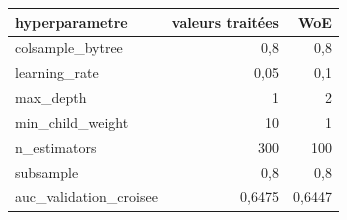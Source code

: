 \begin{tabular}{lrr}
\toprule
\textbf{hyperparametre} & \textbf{valeurs traitées} & \textbf{WoE} \\
\midrule
colsample\_bytree & 0,8 & 0,8 \\
learning\_rate & 0,05 & 0,1 \\
max\_depth & 1 & 2 \\
min\_child\_weight & 10 & 1 \\
n\_estimators & 300 & 100 \\
subsample & 0,8 & 0,8 \\
auc\_validation\_croisee & 0,6475 & 0,6447 \\
\bottomrule
\end{tabular}

